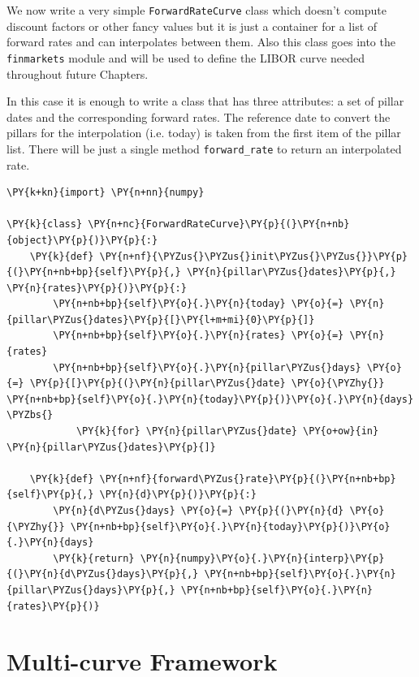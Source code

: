 We now write a very simple \texttt{ForwardRateCurve} class which doesn't compute 
discount factors or other fancy values but it is just a container for a list 
of forward rates and can interpolates between them.
Also this class goes into the \texttt{finmarkets} module and will be used to
define the LIBOR curve needed throughout future Chapters.

In this case it is enough to write a class that has three attributes: 
a set of pillar dates and the corresponding forward rates. The reference date to convert 
the pillars for the interpolation (i.e. today) is taken from the first item of the pillar list.
There will be just a single method \texttt{forward\_rate} to return an interpolated rate.

\begin{codebox}
\begin{Verbatim}[commandchars=\\\{\}]
\PY{k+kn}{import} \PY{n+nn}{numpy}
	
\PY{k}{class} \PY{n+nc}{ForwardRateCurve}\PY{p}{(}\PY{n+nb}{object}\PY{p}{)}\PY{p}{:}	
    \PY{k}{def} \PY{n+nf}{\PYZus{}\PYZus{}init\PYZus{}\PYZus{}}\PY{p}{(}\PY{n+nb+bp}{self}\PY{p}{,} \PY{n}{pillar\PYZus{}dates}\PY{p}{,} \PY{n}{rates}\PY{p}{)}\PY{p}{:}
        \PY{n+nb+bp}{self}\PY{o}{.}\PY{n}{today} \PY{o}{=} \PY{n}{pillar\PYZus{}dates}\PY{p}{[}\PY{l+m+mi}{0}\PY{p}{]}
        \PY{n+nb+bp}{self}\PY{o}{.}\PY{n}{rates} \PY{o}{=} \PY{n}{rates}
        \PY{n+nb+bp}{self}\PY{o}{.}\PY{n}{pillar\PYZus{}days} \PY{o}{=} \PY{p}{[}\PY{p}{(}\PY{n}{pillar\PYZus{}date} \PY{o}{\PYZhy{}} \PY{n+nb+bp}{self}\PY{o}{.}\PY{n}{today}\PY{p}{)}\PY{o}{.}\PY{n}{days} \PYZbs{}
            \PY{k}{for} \PY{n}{pillar\PYZus{}date} \PY{o+ow}{in} \PY{n}{pillar\PYZus{}dates}\PY{p}{]}
	
    \PY{k}{def} \PY{n+nf}{forward\PYZus{}rate}\PY{p}{(}\PY{n+nb+bp}{self}\PY{p}{,} \PY{n}{d}\PY{p}{)}\PY{p}{:}
        \PY{n}{d\PYZus{}days} \PY{o}{=} \PY{p}{(}\PY{n}{d} \PY{o}{\PYZhy{}} \PY{n+nb+bp}{self}\PY{o}{.}\PY{n}{today}\PY{p}{)}\PY{o}{.}\PY{n}{days}
        \PY{k}{return} \PY{n}{numpy}\PY{o}{.}\PY{n}{interp}\PY{p}{(}\PY{n}{d\PYZus{}days}\PY{p}{,} \PY{n+nb+bp}{self}\PY{o}{.}\PY{n}{pillar\PYZus{}days}\PY{p}{,} \PY{n+nb+bp}{self}\PY{o}{.}\PY{n}{rates}\PY{p}{)}
\end{Verbatim}
\end{codebox}

\section{Multi-curve Framework}
\label{sec:financial-crisis}

